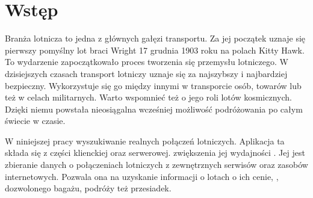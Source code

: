 \documentclass[12pt, twoside]{report}
\begin{document}
\newpage
\chapter*{Wstęp}
Branża lotnicza to jedna z głównych gałęzi  transportu. Za jej początek uznaje się pierwszy pomyślny lot braci Wright 17 grudnia 1903 roku na polach Kitty Hawk. To wydarzenie zapoczątkowało proces tworzenia się przemysłu lotniczego. W dzisiejszych czasach transport lotniczy uznaje się za najszybszy i najbardziej bezpieczny. Wykorzystuje się go między innymi w transporcie osób, towarów lub też w celach militarnych. Warto wspomnieć też o jego roli  lotów kosmicznych. Dzięki niemu powstała nieosiągalna wcześniej możliwość podróżowania po całym świecie w   czasie.\\

W niniejszej pracy  wyszukiwanie realnych połączeń lotniczych. Aplikacja ta składa się z części klienckiej oraz serwerowej.  zwiększenia jej wydajności .
Jej  jest zbieranie danych o połączeniach lotniczych z zewnętrznych serwisów oraz zasobów internetowych.
 Pozwala ona na uzyskanie informacji o lotach  o ich cenie, ,  dozwolonego bagażu,  podróży  też  przesiadek.\\
\end{document}
